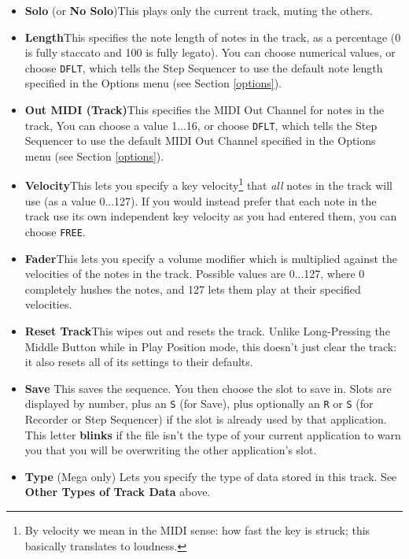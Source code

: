 \documentclass{article}
\begin{document}
\begin{itemize}
\item {\bf Solo} (or {\bf No Solo})\quad This plays only the current track, muting the others.
\item {\bf Length}\quad This specifies the note length of notes in the track, as a percentage (0 is fully staccato and 100 is fully legato).   You can choose numerical values, or choose \texttt{DFLT}, which tells the Step Sequencer to use the default note length specified in the Options menu (see Section \ref{options}).
\item {\bf Out MIDI (Track)}\quad This specifies the MIDI Out Channel for notes in the track,    You can choose a value 1...16, or choose \texttt{DFLT}, which tells the Step Sequencer to use the default MIDI Out Channel specified in the Options menu (see Section \ref{options}).
\item {\bf Velocity}\quad This lets you specify a key velocity\footnote{By velocity we mean in the MIDI sense: how fast the key is struck; this basically translates to loudness.} that {\it all} notes in the track will use (as a value 0...127).  If you would instead prefer that each note in the track use its own independent key velocity as you had entered them, you can choose \texttt{FREE}.
\item {\bf Fader}\quad This lets you specify a volume modifier which is multiplied against the velocities of the notes in the track.  Possible values are 0...127, where 0 completely hushes the notes, and 127 lets them play at their specified velocities. 
\item {\bf Reset Track}\quad This wipes out and resets the track.  Unlike Long-Pressing the Middle Button while in Play Position mode, this doesn't just clear the track: it also resets all of its settings to their defaults.
\item {\bf Save} \quad This saves the sequence. You then choose the slot to save in.  Slots are displayed by number, plus an \texttt{S} (for Save), plus optionally an \texttt{R} or \texttt{S} (for Recorder or Step Sequencer) if the slot is already used by that application.  This letter {\bf blinks} if the file isn't the type of your current application to warn you that you will be overwriting the other application's slot.
\item {\bf Type} (Mega only) \quad Lets you specify the type of data stored in this track.  See {\bf Other Types of Track Data} above.

\end{itemize}
\end{document}
